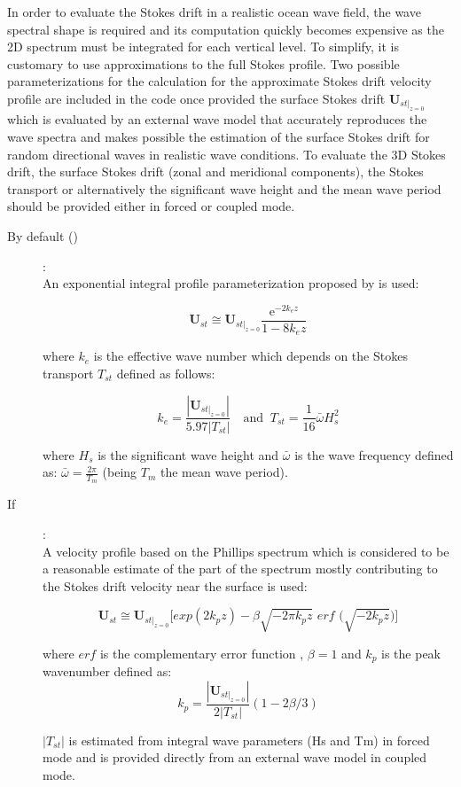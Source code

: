 \documentclass[../main/NEMO_manual]{subfiles}
\begin{document}
In order to evaluate the Stokes drift in a realistic ocean wave field, the wave spectral shape is required
and its computation quickly becomes expensive as the 2D spectrum must be integrated for each vertical level.
To simplify, it is customary to use approximations to the full Stokes profile.
Two possible parameterizations for the calculation for the approximate Stokes drift velocity profile
are included in the code once provided the surface Stokes drift $\mathbf{U}_{st |_{z=0}}$ which is evaluated by an external wave model that accurately reproduces the wave spectra and makes possible the estimation of the surface Stokes drift for random directional waves in realistic wave conditions. To evaluate the 3D Stokes drift, the surface Stokes drift (zonal and meridional components), the Stokes transport or alternatively the significant wave height and the mean wave period should be provided either in forced or coupled mode.

\begin{description}
\item [By default ()]:\\ 
An exponential integral profile parameterization proposed by \citet{breivik.janssen.ea_JPO14} is used:

\[
  \mathbf{U}_{st} \cong \mathbf{U}_{st |_{z=0}} \frac{\mathrm{e}^{-2k_ez}} {1-8k_ez}
\]

where $k_e$ is the effective wave number which depends on the Stokes transport $T_{st}$ defined as follows:

\[
  k_e = \frac{|\mathbf{U}_{\left.st\right|_{z=0}}|} {5.97|T_{st}|}
  \quad \text{and }\
  T_{st} = \frac{1}{16} \bar{\omega} H_s^2
\]

where $H_s$ is the significant wave height and $\bar{\omega}$ is the wave frequency defined as: $\bar{\omega}=\frac{2\pi}{T_m}$ (being $T_m$ the mean wave period).

\item [If  ]: \\

A velocity profile based on the Phillips spectrum which is considered to be a reasonable estimate of the part of the spectrum mostly contributing to the Stokes drift velocity near the surface \citep{breivik.bidlot.ea_OM16} is used:

\[
  \mathbf{U}_{st} \cong \mathbf{U}_{st |_{z=0}} \Big[exp(2k_pz)-\beta \sqrt{-2 \pi k_pz}
  \textit{ erf } \Big(\sqrt{-2 k_pz}\Big)\Big]
\]

where $erf$ is the complementary error function , $ \beta =1$ and $k_p$ is the peak wavenumber defined as:
\[
  k_p = \frac{|\mathbf{U}_{\left.st\right|_{z=0}}|}{2 |T_{st}| } (1-2 \beta /3) 
\]

$|T_{st}|$ is estimated from integral wave parameters (Hs and Tm) in forced mode and is provided directly from an external wave model in coupled mode. 

\end{description}
\end{document}
